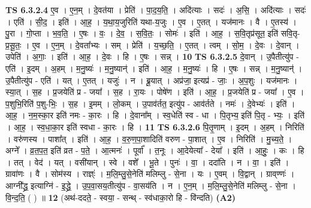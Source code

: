 \documentclass[17pt]{extarticle}
\begin{document}
                  \newline
                                \textbf{ TS 6.3.2.4} \newline
                  ए॒व । ए॒न॒म् । दे॒वत॑या । प्रेति॑ । पा॒द॒य॒ति॒ । अदि॑त्याः । सदः॑ । अ॒सि॒ । अदि॑त्याः । सदः॑ । एति॑ । सी॒द॒ । इति॑ । आ॒ह॒ । य॒था॒य॒जुरिति॑ यथा-य॒जुः । ए॒व । ए॒तत् । यज॑मानः । वै । ए॒तस्य॑ । पु॒रा । गो॒प्ता । भ॒व॒ति॒ । ए॒षः । वः॒ । दे॒व॒ । स॒वि॒तः॒ । सोमः॑ । इति॑ । आ॒ह॒ । स॒वि॒तृप्र॑सूत॒ इति॑ सवि॒तृ-प्र॒सू॒तः॒ । ए॒व । ए॒न॒म् । दे॒वता᳚भ्यः । सम् । प्रेति॑ । य॒च्छ॒ति॒ । ए॒तत् । त्वम् । सो॒म॒ । दे॒वः । दे॒वान् । उपेति॑ । अ॒गाः॒ । इति॑ । आ॒ह॒ । दे॒वः । हि । ए॒षः । सन्न् । \textbf{  10} \newline
                  \newline
                                \textbf{ TS 6.3.2.5} \newline
                  दे॒वान् । उ॒पैतीत्यु॑प - एति॑ । इ॒दम् । अ॒हम् । म॒नु॒ष्यः॑ । म॒नु॒ष्यान्॑ । इति॑ । आ॒ह॒ । म॒नु॒ष्यः॑ । हि । ए॒षः । सन्न् । म॒नु॒ष्यान्॑ । उ॒पैतीत्यु॑प - एति॑ । यत् । ए॒तत् । यजुः॑ । न । ब्रू॒यात् । अप्र॑जा॒ इत्यप्र॑ - जाः॒ । अ॒प॒शुः । यज॑मानः । स्या॒त् । स॒ह । प्र॒जयेति॑ प्र - जया᳚ । स॒ह । रा॒यः । पोषे॑ण । इति॑ । आ॒ह॒ । प्र॒जयेति॑ प्र - जया᳚ । ए॒व । प॒शुभि॒रिति॑ प॒शु-भिः॒ । स॒ह । इ॒मम् । लो॒कम् । उ॒पाव॑र्तत॒ इत्यु॑प - आव॑र्तते । नमः॑ । दे॒वेभ्यः॑ । इति॑ । आ॒ह॒ । न॒म॒स्का॒र इति॑ नमः - का॒रः । हि । दे॒वाना᳚म् । स्व॒धेति॑ स्व - धा । पि॒तृभ्य॒ इति॑ पि॒तृ - भ्यः॒ । इति॑ । आ॒ह॒ । स्व॒धा॒का॒र इति॑ स्वधा - का॒रः । हि । \textbf{  11} \newline
                  \newline
                                \textbf{ TS 6.3.2.6} \newline
                  पि॒तृ॒णाम् । इ॒दम् । अ॒हम् । निरिति॑ । वरु॑णस्य । पाशा᳚त् । इति॑ । आ॒ह॒ । व॒रु॒ण॒पा॒शादिति॑ वरुण - पा॒शात् । ए॒व । निरिति॑ । मु॒च्य॒ते॒ । अग्ने᳚ । व्र॒त॒प॒त॒ इति॑ व्रत - प॒ते॒ । आ॒त्मनः॑ । पूर्वा᳚ । त॒नूः । आ॒देयेत्या᳚ - देया᳚ । इति॑ । आ॒हुः॒ । कः । हि । तत् । वेद॑ । यत् । वसी॑यान् । स्वे । वशे᳚ । भू॒ते । पुनः॑ । वा॒ । ददा॑ति । न । वा॒ । इति॑ । ग्रावा॑णः । वै । सोम॑स्य । राज्ञ्ः॑ । म॒लि॒म्लु॒से॒नेति॑ मलिम्लु - से॒ना । यः । ए॒वम् । वि॒द्वान् । ग्राव्‌ण्णः॑  । आग्नी᳚द्ध्र॒ इत्याग्नि॑ - इ॒द्ध्रे॒ । उ॒प॒वा॒सय॒तीत्यु॑प - वा॒सय॑ति । न । ए॒न॒म् । म॒लि॒म्लु॒से॒नेति॑ मलिम्लु - से॒ना । वि॒न्द॒ति॒ ( ) ॥ \textbf{  12 } \newline
                  \newline
                      (अथ॑-ददते॒ - स्वया॒ - सन्थ् - स्व॑धाका॒रो हि - वि॑न्दति)  \textbf{(A2)} \newline \newline
\end{document}
